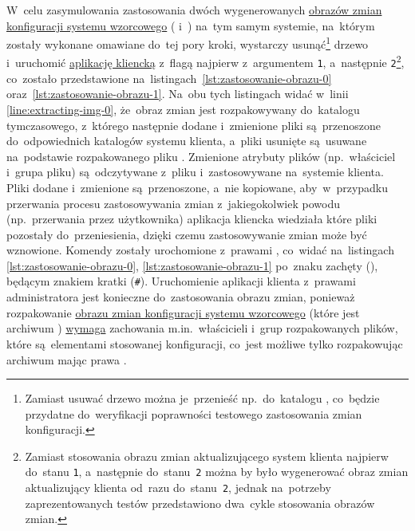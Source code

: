 \documentclass[thesis]{subfiles}
\begin{document}
W~celu zasymulowania zastosowania dwóch wygenerowanych \hyperref[sec:obraz-zmian-konfiguracji]{obrazów zmian konfiguracji systemu wzorcowego} ( i~) na~tym samym systemie, na~którym zostały wykonane omawiane do~tej pory kroki, wystarczy usunąć\footnote{Zamiast usuwać drzewo  można je~przenieść np.~do~katalogu , co~będzie przydatne do~weryfikacji poprawności testowego zastosowania zmian konfiguracji.} drzewo  i~uruchomić \hyperref[sec:cli-app]{aplikację kliencką} z~flagą  najpierw z~argumentem \texttt{1}, a~następnie \texttt{2}\footnote{Zamiast stosowania obrazu zmian aktualizującego system klienta najpierw do~stanu \texttt{1}, a~następnie do~stanu~\texttt{2} można by było wygenerować obraz zmian aktualizujący klienta od~razu do~stanu~\texttt{2}, jednak na~potrzeby zaprezentowanych testów przedstawiono dwa~cykle stosowania obrazów zmian.}, co~zostało przedstawione na~listingach~\ref{lst:zastosowanie-obrazu-0} oraz~\ref{lst:zastosowanie-obrazu-1}. Na~obu tych listingach widać w~linii \ref{line:extracting-img-0}, że~obraz zmian jest rozpakowywany do~katalogu tymczasowego, z~którego następnie dodane i~zmienione pliki są~przenoszone do~odpowiednich katalogów systemu klienta, a~pliki usunięte są~usuwane na~podstawie rozpakowanego pliku . Zmienione atrybuty plików (np.~właściciel i~grupa pliku) są~odczytywane z~pliku  i~zastosowywane na~systemie klienta. Pliki dodane i~zmienione są~przenoszone, a~nie kopiowane, aby~w~przypadku przerwania procesu zastosowywania zmian z~jakiegokolwiek powodu (np.~przerwania przez użytkownika) aplikacja kliencka wiedziała które pliki pozostały do~przeniesienia, dzięki czemu zastosowywanie zmian może być wznowione. Komendy  zostały urochomione z~prawami \superuser{}, co~widać na~listingach \ref{lst:zastosowanie-obrazu-0}, \ref{lst:zastosowanie-obrazu-1} po~znaku zachęty (), będącym znakiem kratki (\texttt{\#}). Uruchomienie aplikacji klienta z~prawami administratora jest konieczne do~zastosowania obrazu zmian, ponieważ rozpakowanie \hyperref[sec:obraz-zmian-konfiguracji]{obrazu zmian konfiguracji systemu wzorcowego} (które jest archiwum \targz{}) \href{https://superuser.com/questions/838392/how-to-tar-a-directory-preserving-not-only-permissions-but-ownership-too}{wymaga} zachowania m.in.~właścicieli i~grup rozpakowanych plików, które są~elementami stosowanej konfiguracji, co~jest możliwe tylko rozpakowując archiwum mając prawa \superuser{}.
\end{document}
